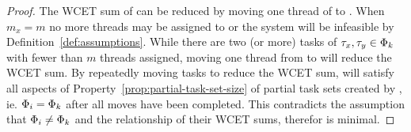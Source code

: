 \documentclass[a4paper,UKenglish,cleveref,autoref,english]{lipics-v2019}
\begin{document}
\begin{theorem}
\begin{proof}
    The WCET sum of  can be reduced by moving one thread of
     to . When ${m_x = m}$ no more threads may be
    assigned to  or the system will be infeasible by
    Definition~\ref{def:assumptions}. While there are two (or more)
    tasks of ${\tau_{x}, \tau_{y} \in \Phi_{k}}$ with fewer than
    ${m}$ threads assigned, moving one thread from  to
     will reduce the WCET sum. By repeatedly moving tasks to
    reduce the WCET sum,  will satisfy all aspects of
    Property~\ref{prop:partial-task-set-size} of partial task sets
    created by \texdivide{}, ie. ${\Phi_{i} = \Phi_{k}}$ after
    all moves have been completed. This contradicts the assumption
    that ${\Phi_{i} \not = \Phi_{k}}$ and the relationship of
    their WCET sums, therefor  is minimal.
  \end{proof}
\end{theorem}

\setcounter{__lasttheorem}{\value{theorem}}
\end{document}
